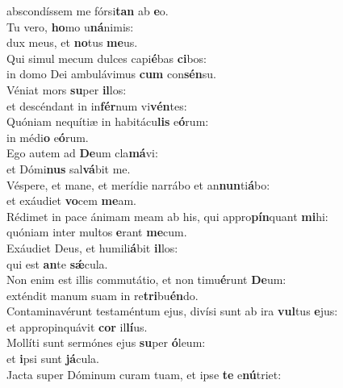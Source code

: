 \oddverse abscondíssem me fórsi\textbf{tan} ab \textbf{e}o.\\
\evenverse Tu vero, \textbf{ho}mo u\textbf{ná}nimis:~\*\\
\evenverse dux meus, et \textbf{no}tus \textbf{me}us.\\
\oddverse Qui simul mecum dulces capi\textbf{é}bas \textbf{ci}bos:~\*\\
\oddverse in domo Dei ambulávimus \textbf{cum} con\textbf{sén}su.\\
\evenverse Véniat mors \textbf{su}per \textbf{il}los:~\*\\
\evenverse et descéndant in in\textbf{fér}num vi\textbf{vén}tes:\\
\oddverse Quóniam nequítiæ in habitácu\textbf{lis} e\textbf{ó}rum:~\*\\
\oddverse in médi\textbf{o} e\textbf{ó}rum.\\
\evenverse Ego autem ad \textbf{De}um cla\textbf{má}vi:~\*\\
\evenverse et Dómi\textbf{nus} sal\textbf{vá}bit me.\\
\oddverse Véspere, et mane, et merídie narrábo et an\textbf{nun}ti\textbf{á}bo:~\*\\
\oddverse et exáudiet \textbf{vo}cem \textbf{me}am.\\
\evenverse Rédimet in pace ánimam meam ab his, qui appro\textbf{pín}quant \textbf{mi}hi:~\*\\
\evenverse quóniam inter multos \textbf{e}rant \textbf{me}cum.\\
\oddverse Exáudiet Deus, et humili\textbf{á}bit \textbf{il}los:~\*\\
\oddverse qui est \textbf{an}te \textbf{sǽ}cula.\\
\evenverse Non enim est illis commutátio, et non timu\textbf{é}runt \textbf{De}um:~\*\\
\evenverse exténdit manum suam in re\textbf{tri}bu\textbf{én}do.\\
\oddverse Contaminavérunt testaméntum ejus, divísi sunt ab ira \textbf{vul}tus \textbf{e}jus:~\*\\
\oddverse et appropinquávit \textbf{cor} il\textbf{lí}us.\\
\evenverse Mollíti sunt sermónes ejus \textbf{su}per \textbf{ó}leum:~\*\\
\evenverse et \textbf{i}psi sunt \textbf{já}cula.\\
\oddverse Jacta super Dóminum curam tuam, et ipse \textbf{te} e\textbf{nú}triet:~\*\\
